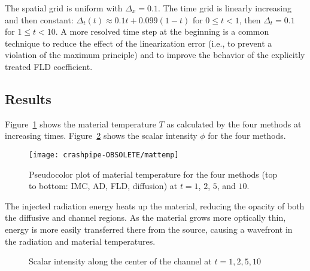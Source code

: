 \documentclass[11pt,letter,twoside]{mc2011}
\begin{document}
The spatial grid is uniform with $\Delta_x=0.1$. The time grid is linearly
increasing and then constant: $\Delta_t(t)\approx 0.1 t + 0.099 (1 - t)$ for $0
\le t < 1$, then $\Delta_t=0.1$ for $1 \le t < 10$. A more resolved time step at
the beginning is a common technique to reduce the effect of the linearization
error (i.e., to prevent a violation of the maximum principle) and to improve
the behavior of the explicitly treated FLD coefficient.

\subsection{Results}
Figure~\ref{fig:mattemp2d} shows the material temperature $T$ as calculated
by the four methods at increasing times. Figure~\ref{fig:phi}
shows the scalar intensity $\phi$ for the four methods.
%
\begin{figure}[htb]
  \centering
  \texttt{[image: crashpipe-OBSOLETE/mattemp]}
  \caption{Pseudocolor plot of material temperature for the four methods (top
  to bottom: IMC, AD, FLD, diffusion) at $t=1$, $2$, $5$, and $10$.}
  \label{fig:mattemp2d}
\end{figure}
%
The injected radiation energy heats up the material, reducing the opacity of
both the diffusive and channel regions. As the material grows more optically
thin, energy is more easily transferred there from the source, causing a
wavefront in the radiation and material temperatures.

\begin{figure}[htb]
  \centering
  \hspace{-1.25in}
  \subfloat[$t=1.0$]{
  \small}
  \hspace{-.4in}
  \subfloat[$t=2.0$]{
  \small}
  \hspace{-1.25in}

  \hspace{-1.25in}
  \subfloat[$t=5.0$]{
  \small}
  \hspace{-.4in}
  \subfloat[$t=10.0$]{
  \small}
  \hspace{-1.25in}
  \caption{Scalar intensity along the center of the channel at $t=1,2,5,10$}
  \label{fig:phi}
\end{figure}
\end{document}
